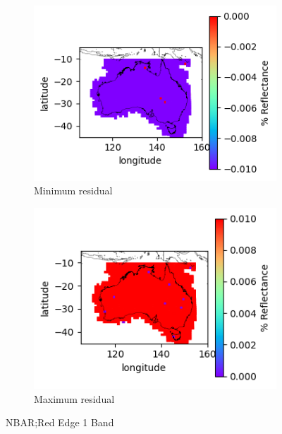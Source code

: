 \documentclass[a4paper]{article}
\begin{document}
      \begin{figure}[h!]
        \centering
          \begin{subfigure}[l]{.4\linewidth}
            \hspace{-32mm}
            \includegraphics[scale=0.9]{plots/nbar/nbar_red_edge_1-MinResidual.png}
            \caption{Minimum residual}
          \end{subfigure}
%
          \begin{subfigure}[r]{.4\linewidth}
            \includegraphics[scale=0.9]{plots/nbar/nbar_red_edge_1-MaxResidual.png}
            \caption{Maximum residual}
          \end{subfigure}
        \caption{NBAR;\@ Red Edge 1 Band}\label{figure:10}
      \end{figure}

  \clearpage
\end{document}
